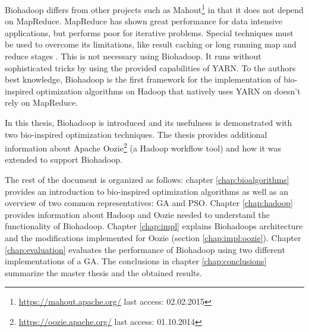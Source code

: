 Biohadoop differs from other projects such as Mahout\footnote{\url{https://mahout.apache.org/} last access: 02.02.2015} in that it does not depend on MapReduce. MapReduce has shown great performance for data intensive applications, but performs poor for iterative problems. Special techniques must be used to overcome its limitations, like result caching \cite{bu2010haloop} or long running map and reduce stages \cite{ekanayake2010twister}. This is not necessary using Biohadoop. It runs without sophisticated tricks by using the provided capabilities of YARN. To the authors best knowledge, Biohadoop is the first framework for the implementation of bio-inspired optimization algorithms on Hadoop that natively uses YARN on doesn't rely on MapReduce.

In this thesis, Biohadoop is introduced and its usefulness is demonstrated with two bio-inspired optimization techniques. The thesis provides additional information about Apache Oozie\footnote{\url{https://oozie.apache.org/} last access: 01.10.2014} (a Hadoop workflow tool) and how it was extended to support Biohadoop.

The rest of the document is organized as follows: chapter \ref{chap:bioalgorithms} provides an introduction to bio-inspired optimization algorithms as well as an overview of two common representatives: GA and PSO. Chapter \ref{chap:hadoop} provides information about Hadoop and Oozie needed to understand the functionality of Biohadoop. Chapter \ref{chap:impl} explains Biohadoops architecture and the modifications implemented for Oozie (section \ref{chap:impl:oozie}). Chapter \ref{chap:evaluation} evaluates the performance of Biohadoop using two different implementations of a GA. The conclusions in chapter \ref{chap:conclusions} summarize the master thesis and the obtained results.